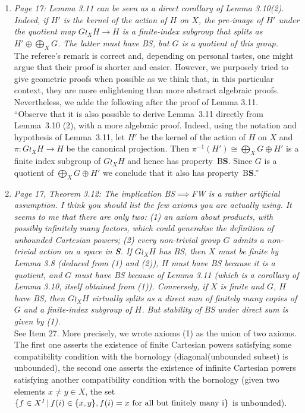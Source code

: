 \documentclass[english,a4paper]{article}
\newcommand*{\BS}{B\textbf{S}}
\begin{document}
\begin{enumerate}
%
\item\textit{Page 17: Lemma 3.11 can be seen as a direct corollary of Lemma 3.10(2). Indeed, if $H'$ is the kernel of the action of $H$ on $X$, the pre-image of $H'$ under the quotient map $G\wr_XH\to H$ is a finite-index subgroup that splits as $H'\oplus\bigoplus_XG$. The latter must have BS, but $G$ is a quotient of this group.}\\
The referee's remark is correct and, depending on personal tastes, one might argue that their proof is shorter and easier.
However, we purposely tried to give geometric proofs when possible as we think that, in this particular context, they are more enlightening than more abstract algebraic proofs.
Nevertheless, we adde the following after the proof of Lemma 3.11.\\
``Observe that it is also possible to derive Lemma~3.11 directly from Lemma~3.10 (2), with a more algebraic proof.
Indeed, using the notation and hypothesis of Lemma~3.11, let $H'$ be the kernel of the action of $H$ on $X$ and $\pi\colon G\wr_XH\to H$ be the canonical projection. Then $\pi^{-1}(H')\cong \bigoplus_XG\oplus H'$ is a finite index subgroup of $G\wr_XH$ and hence has property~\BS.
Since $G$ is a quotient of $\bigoplus_XG\oplus H'$ we conclude that it also has property~\BS.''
%
\item\textit{Page 17, Theorem 3.12: The implication BS$\implies$FW is a rather artificial assumption. I think you should list the few axioms you are actually using. It seems to me that there are only two: (1) an axiom about products, with possibly infinitely many factors, which could generalise the definition of unbounded Cartesian powers; (2) every non-trivial group $G$ admits a non-trivial action on a space in \textbf{S}.
If $G\wr_XH$ has BS, then $X$ must be finite by Lemma 3.8 (deduced from (1) and (2)), $H$ must have BS because it is a quotient, and $G$ must have BS because of Lemma 3.11 (which is a corollary of Lemma 3.10, itself obtained from (1)). Conversely, if $X$ is finite and $G$, $H$ have BS, then $G\wr_XH$ virtually splits as a direct sum of finitely many copies of $G$ and a finite-index subgroup of $H$. But stability of BS under direct sum is given by (1).}\\
See Item 27. More precisely, we wrote axioms (1) as the union of two axioms. The first one asserts the existence of finite Cartesian powers satisfying some compatibility condition with the bornology (diagonal(unbounded subset) is unbounded), the second one asserts the existence of infinite Cartesian powers satisfying another compatibility condition with the bornology (given two elements $x\neq y\in X$, the set $\{f\in X^I\,|\,f(i)\in\{x,y\}, f(i)=x \textnormal{ for all but finitely many i}\}$ is unbounded).

\end{enumerate}
\end{document}
